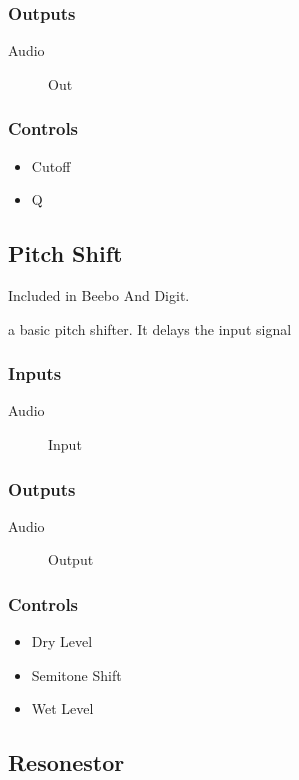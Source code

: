\subsubsection{Outputs}
\begin{description}
\item [Audio] Out
\end{description}

\subsubsection{Controls}
\begin{itemize}
\item Cutoff
\item Q
\end{itemize}

\subsection{Pitch Shift}

Included in Beebo And Digit.

a basic pitch shifter. It delays the input signal



\subsubsection{Inputs}
\begin{description}
\item [Audio] Input
\end{description}

\subsubsection{Outputs}
\begin{description}
\item [Audio] Output
\end{description}

\subsubsection{Controls}
\begin{itemize}
\item Dry Level
\item Semitone Shift
\item Wet Level
\end{itemize}

\subsection{Resonestor}


